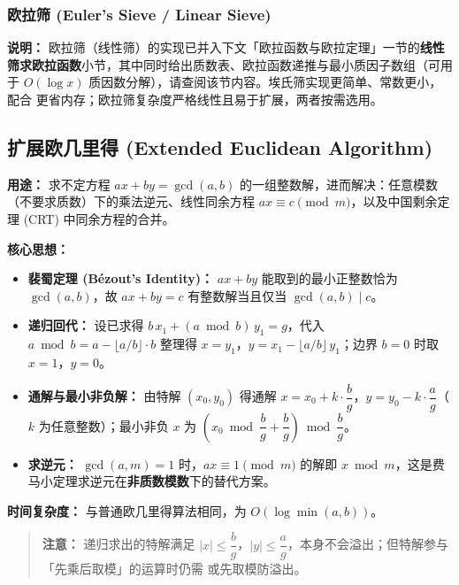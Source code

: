 \subsubsection{欧拉筛 (Euler's Sieve / Linear Sieve)}

\textbf{说明：} 欧拉筛（线性筛）的实现已并入下文「欧拉函数与欧拉定理」一节的\textbf{线性筛求欧拉函数}小节，其中同时给出质数表、欧拉函数递推与最小质因子数组（可用于 $O(\log x)$ 质因数分解），请查阅该节内容。埃氏筛实现更简单、常数更小，配合  更省内存；欧拉筛复杂度严格线性且易于扩展，两者按需选用。

\subsection{扩展欧几里得 (Extended Euclidean Algorithm)}

\textbf{用途：}
求不定方程 $ax + by = \gcd(a, b)$ 的一组整数解，进而解决：任意模数（不要求质数）下的乘法逆元、线性同余方程 $ax \equiv c \pmod{m}$，以及中国剩余定理 (CRT) 中同余方程的合并。

\textbf{核心思想：}
\begin{itemize}
    \item \textbf{裴蜀定理 (Bézout's Identity)：} $ax + by$ 能取到的最小正整数恰为 $\gcd(a, b)$，故 $ax + by = c$ 有整数解当且仅当 $\gcd(a, b) \mid c$。
    \item \textbf{递归回代：} 设已求得 $b\,x_1 + (a \bmod b)\,y_1 = g$，代入 $a \bmod b = a - \lfloor a/b \rfloor \cdot b$ 整理得 $x = y_1$，$y = x_1 - \lfloor a/b \rfloor\, y_1$；边界 $b = 0$ 时取 $x = 1$，$y = 0$。
    \item \textbf{通解与最小非负解：} 由特解 $(x_0, y_0)$ 得通解 $x = x_0 + k\cdot\dfrac{b}{g}$，$y = y_0 - k\cdot\dfrac{a}{g}$（$k$ 为任意整数）；最小非负 $x$ 为 $\left(x_0 \bmod \dfrac{b}{g} + \dfrac{b}{g}\right) \bmod \dfrac{b}{g}$。
    \item \textbf{求逆元：} $\gcd(a, m) = 1$ 时，$ax \equiv 1 \pmod{m}$ 的解即 $x \bmod m$，这是费马小定理求逆元在\textbf{非质数模数}下的替代方案。
\end{itemize}

\textbf{时间复杂度：} 与普通欧几里得算法相同，为 $O(\log \min(a, b))$。



\begin{quote}
\textbf{注意：} 递归求出的特解满足 $|x| \le \dfrac{b}{g}$，$|y| \le \dfrac{a}{g}$，本身不会溢出；但特解参与「先乘后取模」的运算时仍需  或先取模防溢出。
\end{quote}

